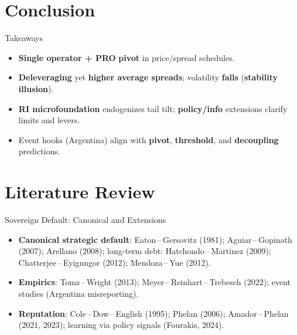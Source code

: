 \documentclass[aspectratio=169,11pt,professionalfonts]{beamer}
\newcommand{\1}{\mathbb{1}}
\begin{document}
\section{Conclusion}

\begin{frame}{Takeaways}
  \begin{itemize}
    \item \textbf{Single operator + PRO} \Rightarrow \textbf{pivot} in price/spread schedules.
    \item \textbf{Deleveraging} yet \textbf{higher average spreads}; volatility \textbf{falls} (\textbf{stability illusion}).
    \item \textbf{RI microfoundation} endogenizes tail tilt; \textbf{policy/info} extensions clarify limits and levers.
    \item Event hooks (Argentina) align with \textbf{pivot}, \textbf{threshold}, and
          \textbf{decoupling} predictions.
  \end{itemize}
\end{frame}

\section{Literature Review}

\begin{frame}{Sovereign Default: Canonical and Extensions}
  \begin{itemize}
    \item \textbf{Canonical strategic default}: Eaton\,–\,Gersovitz (1981); Aguiar\,–\,Gopinath (2007); Arellano (2008);
          long-term debt: Hatchondo\,–\,Martinez (2009); Chatterjee\,–\,Eyigungor (2012); Mendoza\,–\,Yue (2012).
    \item \textbf{Empirics}: Tomz\,–\,Wright (2013); Meyer\,–\,Reinhart\,–\,Trebesch (2022); event studies (Argentina misreporting).
    \item \textbf{Reputation}: Cole\,–\,Dow\,–\,English (1995); Phelan (2006); Amador\,–\,Phelan (2021, 2023);
          learning via policy signals (Fourakis, 2024).
  \end{itemize}
\end{frame}
\end{document}
